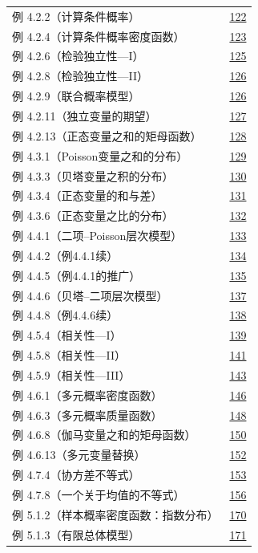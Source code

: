 \begin{longtable}{@{}p{}r@{}}
例 4.2.2（计算条件概率） & \hyperref[ex:4.2.2]{122} \\
例 4.2.4（计算条件概率密度函数） & \hyperref[ex:4.2.4]{123} \\
例 4.2.6（检验独立性—I） & \hyperref[ex:4.2.6]{125} \\
例 4.2.8（检验独立性—II） & \hyperref[ex:4.2.8]{126} \\
例 4.2.9（联合概率模型） & \hyperref[ex:4.2.9]{126} \\
例 4.2.11（独立变量的期望） & \hyperref[ex:4.2.11]{127} \\
例 4.2.13（正态变量之和的矩母函数） & \hyperref[ex:4.2.13]{128} \\
例 4.3.1（Poisson变量之和的分布） & \hyperref[ex:4.3.1]{129} \\
例 4.3.3（贝塔变量之积的分布） & \hyperref[ex:4.3.3]{130} \\
例 4.3.4（正态变量的和与差） & \hyperref[ex:4.3.4]{131} \\
例 4.3.6（正态变量之比的分布） & \hyperref[ex:4.3.6]{132} \\
例 4.4.1（二项–Poisson层次模型） & \hyperref[ex:4.4.1]{133} \\
例 4.4.2（例4.4.1续） & \hyperref[ex:4.4.2]{134} \\
例 4.4.5（例4.4.1的推广） & \hyperref[ex:4.4.5]{135} \\
例 4.4.6（贝塔–二项层次模型） & \hyperref[ex:4.4.6]{137} \\
例 4.4.8（例4.4.6续） & \hyperref[ex:4.4.8]{138} \\
例 4.5.4（相关性—I） & \hyperref[ex:4.5.4]{139} \\
例 4.5.8（相关性—II） & \hyperref[ex:4.5.8]{141} \\
例 4.5.9（相关性—III） & \hyperref[ex:4.5.9]{143} \\
例 4.6.1（多元概率密度函数） & \hyperref[ex:4.6.1]{146} \\
例 4.6.3（多元概率质量函数） & \hyperref[ex:4.6.3]{148} \\
例 4.6.8（伽马变量之和的矩母函数） & \hyperref[ex:4.6.8]{150} \\
例 4.6.13（多元变量替换） & \hyperref[ex:4.6.13]{152} \\
例 4.7.4（协方差不等式） & \hyperref[ex:4.7.4]{153} \\
例 4.7.8（一个关于均值的不等式） & \hyperref[ex:4.7.8]{156} \\
\addlinespace[.5em]
例 5.1.2（样本概率密度函数：指数分布） & \hyperref[ex:5.1.2]{170} \\
例 5.1.3（有限总体模型） & \hyperref[ex:5.1.3]{171} \\

\end{longtable}
